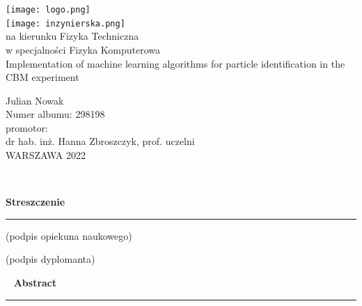 \pagestyle{empty}

\begin{titlepage}
	
\begin{minipage}{\textwidth}
	\begin{center}
		\texttt{[image: logo.png]} \\
			\vspace{3cm}
		\texttt{[image: inzynierska.png]} \\ %
			\vspace{1.5cm}
  			na kierunku Fizyka Techniczna \\
			w specjalności Fizyka Komputerowa \\
			\vspace{2cm}	
		{\Large
			Implementation of machine learning algorithms for particle identification in the CBM experiment}

			\vspace{2cm}	
		{\huge
			Julian Nowak} \\
			Numer albumu: 298198 \\
			\vspace{1.5cm}	
			promotor: \\
			dr hab. inż. Hanna Zbroszczyk, prof. uczelni \\
			\vspace{3cm}
			WARSZAWA 2022		
	\end{center}
\end{minipage}

\end{titlepage}

\newpage
\mbox{ }

\newpage
{\large \textbf{Streszczenie}}\\
{\color{sliwka}\rule[1pt]{\textwidth}{1.5pt}}




\vspace{2cm}

\begin{multicols}{2}
	\begin{flushleft}
		(podpis opiekuna naukowego)
	\end{flushleft}
	\begin{flushright}
		(podpis dyplomanta)
	\end{flushright}
\end{multicols}

\newpage
\mbox{ }
\newpage
{\large \textbf{Abstract}}\\
{\color{sliwka}\rule[1pt]{\textwidth}{1.5pt}}


